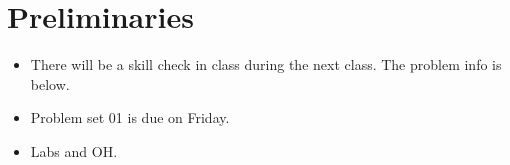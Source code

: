 \documentclass[12pt,letterpaper,noanswers]{exam}
\newcommand{\note}[1]{\textcolor{red}{#1}} %
\renewcommand{\note}[1]{} %
\begin{document}
 \pdfpageheight 11in 
  \pdfpagewidth 8.5in

\noindent 

\note{calendar:
\begin{enumerate}
    \item Tu binary subtraction, least sq intro PS01/2
    \item Th least sq PS02
    \item Tu lin alg PS02/3
    \item Th lin alg PS03
    \item Tu least sq PS03/4
    \item Th ?? PS04
    \item Tu root finding PS04/5
    \item Th root finding PS05 (early)
    \item Tu integration PS06
    \item Th quiz
    \item Tu interpolation PS06
    \item Th interpolation PS06
    \item Tu integration PS07
    \item Th Monte Carlo PS07
    \item Tu differentiation PS08
    \item Th differentiation PS08
    \item Tu diff eq
    \item Th application of diff eq
    \item Tu ODEs
    \item Th ODEs
    \item Tu neural nets
    \item Tu neural nets
    \item Th quiz
    \item Tu presentations
\end{enumerate}}

\note{
\begin{itemize}
    \item what is a floating point system
    \item example
    \item IDing info about a floating point system
    \item 
\end{itemize}
}
\setcounter{section}{-1}
\section{Preliminaries}
\begin{itemize}
\itemsep0pt
\item There will be a skill check in class during the next class.  The problem info is below.
\item Problem set 01 is due on Friday.
\item Labs and OH.
\end{itemize}
\end{document}
